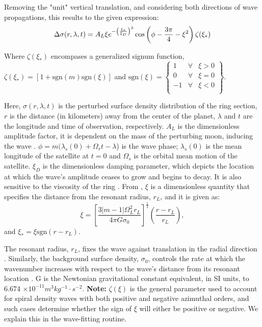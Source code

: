 \documentclass{article}
\begin{document}
Removing the "unit" vertical translation, and considering both directions of wave propagations, this results to the given expression: 
\begin{equation}
   \Delta \sigma(r,\lambda,t) = A_{L}\xi\\e^{-\left(\frac{\xi_{*}}{\xi_{D}}\right)^3}\cos\left(\phi-\frac{3\pi}{4}-\xi^2\right)\zeta(\xi_{*})
\end{equation}

Where $\zeta(\xi_{*})$ encompases a generalized signum function, $\zeta(\xi_{*}) = [1 + \mathrm{sgn}(m)\mathrm{sgn}(\xi)]$  and $ \mathrm{sgn}(\xi) = \left\{ \begin{array}{rcl}
1 & \forall
& \xi>0 \\ 0 & \forall & \xi=0 \\ -1 & \forall & \xi<0 \\
\end{array}\right\}$.

\vspace{3pt}

Here, $\sigma(r,\lambda,t)$ is the perturbed surface density distribution of the ring section, $r$ is the distance (in kilometers) away from the center of the planet, $\lambda$ and $t$ are the longitude and time of observation, respectively. $A_{L}$ is the dimensionless amplitude factor, it is dependent on the mass of the perturbing moon, inducing the wave \cite{Tiscareno_2007}. $\phi = m(\lambda_{s}(0)+\Omega_{s}t-\lambda$) is the wave phase; $\lambda_{s}(0)$ is the mean longitude of the satellite at $t=0$ and $\Omega_{s}$ is the orbital mean motion of the satellite. $\xi_{D}$ is the dimensionless damping parameter, which depicts the location at which the wave's amplitude ceases to grow and begins to decay. It is also sensitive to the viscosity of the ring \cite{Tiscareno_2007}.
From \cite{Nicholson1990AnAR} \cite{1984prin.conf..513S}, $\xi$ is a dimensionless quantity that specifies the distance from the resonant radius, $r_{L}$, and it is given as:
\begin{equation}
\xi = \left[\frac{3|m-1|\Omega_{L}^{2}r_{L}}{4\pi G \sigma_{0}}\right]^{\frac{1}{2}}\left(\frac{r-r_{L}}{r_{L}}\right), 
\end{equation}
and $\xi_{*} = \xi \mathrm{sgn}(r - r_{L})$.

\vspace{3pt}

The resonant radius, $r_{L}$, fixes the wave against translation in the radial direction \cite{Tiscareno_2007}. Similarly, the background surface density, $\sigma_{0}$, controls the rate at which the wavenumber increases with respect to the wave's distance from its resonant location \cite{Tiscareno_2007}. G is the Newtonian gravitational constant equivalent, in SI units, to 6.674 $\times 10^{-11} m^{3}kg^{-1}⋅s^{-2}$.
\textbf{Note:} $\zeta(\xi)$ is the general parameter used to account for spiral density waves with both positive and negative azimuthal orders, and such cases determine whether the sign of $\xi$ will either be positive or negative. We explain this in the wave-fitting routine.
\end{document}
